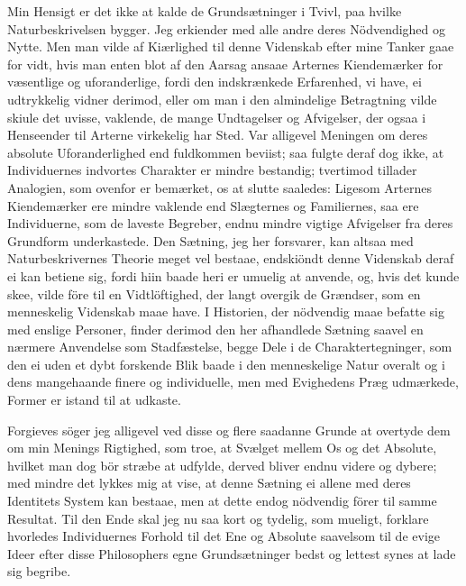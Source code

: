\documentclass[12pt,a4paper]{article}
\newcommand{\opage}[1]{\marginnote{\footnotesize\textit{[#1]}}}
\begin{document}
Min Hensigt er det ikke at kalde de Grundsætninger i Tvivl, paa hvilke
Naturbeskrivelsen bygger. Jeg erkiender med alle andre deres Nödvendighed
og Nytte. Men man vilde af Kiærlighed til denne Videnskab efter mine Tanker
gaae for vidt, hvis man enten blot af den Aarsag ansaae Arternes
Kiendemærker for væsentlige og uforanderlige, fordi den indskrænkede
Erfarenhed, vi have, ei udtrykkelig vidner derimod, eller om man i den
almindelige Betragtning vilde skiule det uvisse, vaklende, de mange
Undtagelser og Afvigelser, der ogsaa i Henseender til Arterne virkekelig
har Sted. %
Var alligevel Meningen om deres absolute Uforanderlighed end fuldkommen
beviist; saa fulgte deraf dog ikke, at Individuernes indvortes Charakter er
mindre bestandig; tvertimod tillader Analogien, som ovenfor er bemærket, os
at slutte saaledes: Ligesom Arternes Kiendemærker ere mindre vaklende end
Slægternes og Familiernes, saa ere Individuerne, som de laveste Begreber,
endnu mindre vigtige Afvigelser fra deres Grundform underkastede. Den
Sætning, jeg her forsvarer, kan altsaa med Naturbeskrivernes Theorie meget
vel bestaae, endskiöndt denne Videnskab deraf ei kan betiene sig, fordi
hiin baade heri er umuelig at anvende, og, hvis det kunde skee, vilde före
til en Vidtlöftighed, der langt overgik de Grændser, som en menneskelig
Videnskab maae have. I Historien, der nödvendig maae befatte sig med
enslige Personer, finder derimod den her afhandlede Sætning saavel en
nærmere Anvendelse som Stadfæstelse, begge Dele i de Charaktertegninger,
som den ei uden et dybt
\opage{242} forskende Blik baade i den menneskelige Natur overalt og i dens mangehaande
finere og individuelle, men med Evighedens Præg udmærkede, Former er istand
til at udkaste.

Forgieves söger jeg alligevel ved disse og flere saadanne Grunde at
overtyde dem om min Menings Rigtighed, som troe, at Svælget mellem Os og
det Absolute, hvilket man dog bör stræbe at udfylde, derved bliver endnu
videre og dybere; med mindre det lykkes mig at vise, at denne Sætning ei
allene med deres Identitets System kan bestaae, men at dette endog
nödvendig förer til samme Resultat. Til den Ende skal jeg nu saa kort og
tydelig, som mueligt, forklare hvorledes Individuernes Forhold til det Ene
og Absolute saavelsom til de evige Ideer efter disse Philosophers egne
Grundsætninger bedst og lettest synes at lade sig begribe.
\end{document}
